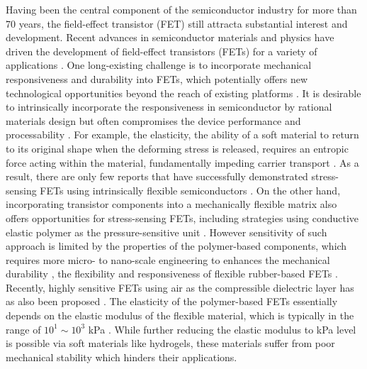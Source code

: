 Having been the central component of the semiconductor industry for
more than 70 years, the field-effect transistor (FET) still attracta
substantial interest and development.
%
Recent advances in semiconductor materials and physics have driven the
development of field-effect transistors (FETs) for a variety of
applications \cite{Torsi_2013_rev,Ben_Sasson_2014_fet_rev}.
%
One
long-existing challenge is to incorporate mechanical responsiveness
and durability into FETs, which potentially offers new technological
opportunities beyond the reach of existing platforms
\cite{Someya_2004,Oh_2016_stretch_polym_FET,Shin_2017_air_FET}. 
%
It is
desirable to intrinsically incorporate the responsiveness in
semiconductor by rational materials design
\cite{Oh_2016_stretch_polym_FET} but often compromises the device
performance and processability \cite{Lee_2018}. For example, the
elasticity, the ability of a soft material to return to its original
shape when the deforming stress is released, requires an entropic
force acting within the material, fundamentally impeding carrier
transport \cite{OConnor_2011_strain_P3HT}.
%
As a result, there are only few reports that have successfully
demonstrated stress-sensing FETs using intrinsically flexible
semiconductors \cite{Oh_2016_stretch_polym_FET}. On the other hand,
incorporating transistor components into a mechanically flexible
matrix also offers opportunities for stress-sensing FETs, including
strategies using conductive elastic polymer as the pressure-sensitive
unit
\cite{Someya_2004,Sekitani_2009,Kaltenbrunner_2013_elastic_device,Takei_2010_NW_skin}.
However sensitivity of such approach is limited by the properties of
the polymer-based components, which requires more micro- to nano-scale
engineering to enhances the mechanical durability
\cite{Jang_2015_soft_network}, the flexibility and responsiveness of
flexible rubber-based FETs
\cite{Mannsfeld_2010_pressure,Schwartz_2013_polymer_transistor}.
Recently, highly sensitive FETs using air as the compressible
dielectric layer has as also been proposed
\cite{Zang_2015_suspend_gate_FET,Shin_2017_air_FET}. The elasticity of
the polymer-based FETs essentially depends on the elastic modulus of
the flexible material, which is typically in the range of
\(10^{1}\sim{}10^{3}\) kPa \cite{Amjadi_2016_stretchable_sensor}.
%
While further reducing the elastic modulus to kPa level is possible
via soft materials like hydrogels, these materials suffer from
 poor mechanical stability which hinders their applications.

